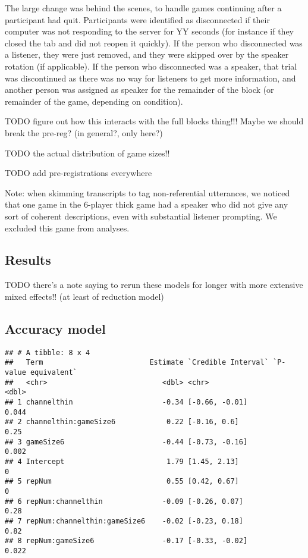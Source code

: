 \documentclass[
  english,
  a4paper,
]{article}
\begin{document}
The large change was behind the scenes, to handle games continuing after a participant had quit. Participants were identified as disconnected if their computer was not responding to the server for YY seconds (for instance if they closed the tab and did not reopen it quickly). If the person who disconnected was a listener, they were just removed, and they were skipped over by the speaker rotation (if applicable). If the person who disconnected was a speaker, that trial was discontinued as there was no way for listeners to get more information, and another person was assigned as speaker for the remainder of the block (or remainder of the game, depending on condition).

TODO figure out how this interacts with the full blocks thing!!! Maybe we should break the pre-reg? (in general?, only here?)

TODO the actual distribution of game sizes!!

TODO add pre-registrations everywhere

Note: when skimming transcripts to tag non-referential utterances, we noticed that one game in the 6-player thick game had a speaker who did not give any sort of coherent descriptions, even with substantial listener prompting. We excluded this game from analyses.

\hypertarget{results-2}{%
\subsection{Results}\label{results-2}}

TODO there's a note saying to rerun these models for longer with more extensive mixed effects!! (at least of reduction model)

\hypertarget{accuracy-model}{%
\subsection{Accuracy model}\label{accuracy-model}}

\begin{verbatim}
## # A tibble: 8 x 4
##   Term                         Estimate `Credible Interval` `P-value equivalent`
##   <chr>                           <dbl> <chr>                              <dbl>
## 1 channelthin                     -0.34 [-0.66, -0.01]                     0.044
## 2 channelthin:gameSize6            0.22 [-0.16, 0.6]                       0.25 
## 3 gameSize6                       -0.44 [-0.73, -0.16]                     0.002
## 4 Intercept                        1.79 [1.45, 2.13]                       0    
## 5 repNum                           0.55 [0.42, 0.67]                       0    
## 6 repNum:channelthin              -0.09 [-0.26, 0.07]                      0.28 
## 7 repNum:channelthin:gameSize6    -0.02 [-0.23, 0.18]                      0.82 
## 8 repNum:gameSize6                -0.17 [-0.33, -0.02]                     0.022
\end{verbatim}
\end{document}
